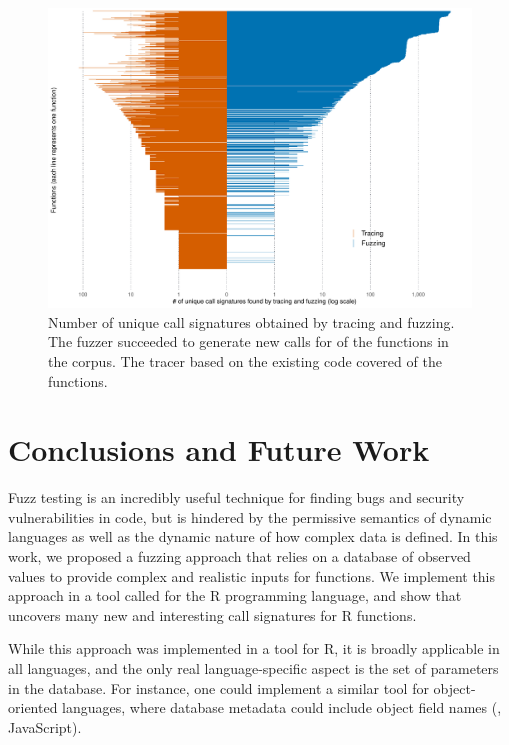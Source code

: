 \documentclass[sigplan,anonymous,review]{acmart}
\begin{document}

\begin{figure}
    \centering
    \includegraphics[width=\columnwidth]{code-and-figures/uf-call-signatures.pdf}
    \caption{Number of unique call signatures obtained by tracing and fuzzing. The fuzzer succeeded to generate new calls for \UFNumFunctionSignatrSignatureRatio of the functions in the corpus. The tracer based on the existing code covered \UFNumFunctionBaselineSignatureRatio of the functions.}
    \label{fig:call-signatures}
\end{figure}

\section{Conclusions and Future Work}
\label{sec:conclusions}

Fuzz testing is an incredibly useful technique for finding bugs and security vulnerabilities in code, but is hindered by the permissive semantics of dynamic languages as well as the dynamic nature of how complex data is defined.
In this work, we proposed a fuzzing approach that relies on a database of observed values to provide complex and realistic inputs for functions.
We implement this approach in a tool called \tool for the R programming language, and show that \tool uncovers many new and interesting call signatures for R functions.

While this approach was implemented in a tool for R, it is broadly applicable in all languages, and the only real language-specific aspect is the set of parameters in the database.
For instance, one could implement a similar tool for object-oriented languages, where database metadata could include object field names (\Eg, JavaScript).
\end{document}

